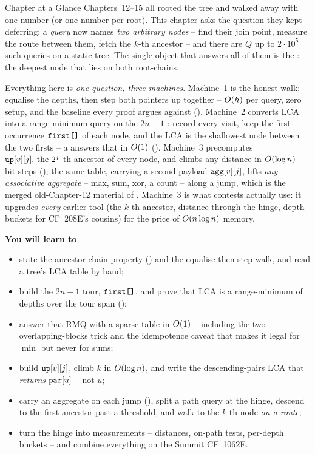\begin{chaptertheorybox}{Chapter at a Glance}
Chapters~12--15 all rooted the tree and walked away with one number (or one
number per root).  This chapter asks the question they kept deferring: a
\emph{query} now names \emph{two arbitrary nodes} -- find their join point,
measure the route between them, fetch the $k$-th ancestor -- and there are
$Q$ up to $2\cdot10^{5}$ such queries on a static tree.  The single object
that answers all of them is the : the deepest
node that lies on both root-chains.

Everything here is \emph{one question, three machines}.  Machine~1 is the
honest walk: equalise the depths, then step both pointers up together --
$O(h)$ per query, zero setup, and the baseline every proof argues
against ().  Machine~2 converts LCA into a range-minimum
query on the \(2n-1\) : record every visit, keep
the first occurrence \(\texttt{first[]}\) of each node, and the LCA is the
shallowest node between the two firsts -- a  answers
that in $O(1)$ ().  Machine~3 precomputes
\(\code{up}[v][j]$, the \(2^j\)-th ancestor of every node, and climbs any
distance in $O(\log n)$ bit-steps (); the same
table, carrying a second payload \(\texttt{agg}[v][j]\), lifts \emph{any
associative aggregate} -- max, sum, xor, a count -- along a jump, which is
the merged old-Chapter-12 material of .  Machine~3
is what contests actually use: it upgrades \emph{every} earlier tool (the
\(k\)-th ancestor, distance-through-the-hinge, depth buckets for
CF~208E's cousins) for the price of $O(n\log n)$ memory.

\textbf{You will learn to}
\begin{itemize}[nosep]
  \item state the ancestor chain property () and the
        equalise-then-step walk, and read a tree's LCA table by hand;
        \hfill{}
  \item build the \(2n-1\) tour, \(\texttt{first[]}\), and prove that LCA is
        a range-minimum of depths over the tour span ();
        \hfill{}
  \item answer that RMQ with a sparse table in \(O(1)\) -- including
        the two-overlapping-blocks trick and the idempotence caveat that
        makes it legal for \(\min\) but never for sums; \hfill{}
  \item build \(\texttt{up}[v][j]\), climb \(k\) in \(O(\log n)\), and
        write the descending-pairs LCA that \emph{returns}
        \(\texttt{par}[u]\) -- not \(u\); \hfill{}--
  \item carry an aggregate on each jump (), split a path
        query at the hinge, descend to the first ancestor past a
        threshold, and walk to the \(k\)-th node \emph{on a route};
        \hfill{}--
  \item turn the hinge into measurements -- distances, on-path tests,
        per-depth buckets -- and combine everything on the Summit
        CF~1062E. \hfill{}
\end{itemize}


\end{chaptertheorybox}
